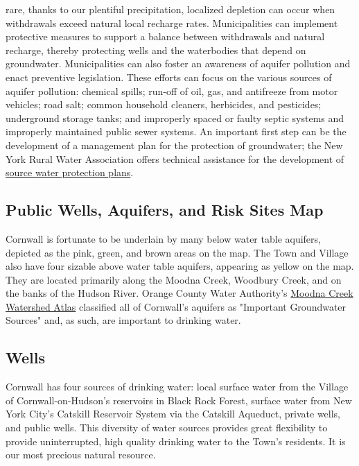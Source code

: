 rare, thanks to our plentiful precipitation, localized depletion can occur when 
withdrawals exceed natural local recharge rates. Municipalities can implement 
protective measures to support a balance between withdrawals and natural 
recharge, thereby protecting wells and the waterbodies that depend on 
groundwater. Municipalities can also foster an awareness of aquifer pollution 
and enact preventive legislation. These efforts can focus on the various sources 
of aquifer pollution: chemical spills; run-off of oil, gas, and antifreeze from 
motor vehicles; road salt; common household cleaners, herbicides, and 
pesticides; underground storage tanks; and improperly spaced or faulty septic 
systems and improperly maintained public sewer systems. An important first step 
can be the development of a management plan for the protection of groundwater; 
the New York Rural Water Association offers technical assistance for the 
development of \href{ 
http://www.nyruralwater.org/sites/default/files/Fact\%20Sheet10\_1-5-2018.pdf}{ 
source water protection plans}.

\subsection*{Public Wells, Aquifers, and Risk Sites Map}
Cornwall is fortunate to be underlain by many below water table aquifers, 
depicted as the pink, green, and brown areas on the map. The Town and Village 
also have four sizable above water table aquifers, appearing as yellow on the 
map. They are located primarily along the Moodna Creek, Woodbury Creek, and on 
the banks of the Hudson River. Orange County Water Authority's 
\href{
http://www.kj-seqra.com/507Acres/ReferenceMaterial/OCWA\%202008\%20Moodna\%20Wat
ershed\%20Atlas\%20(39MB).pdf}{Moodna Creek Watershed Atlas} classified all of 
Cornwall’s aquifers as "Important Groundwater Sources" and, as such, are 
important to drinking water.


\label{map:wells}

\subsection*{Wells}\label{subsec:wells}
Cornwall has four sources of drinking water: local surface water from the 
Village of Cornwall-on-Hudson’s reservoirs in Black Rock Forest, surface water 
from New York City’s Catskill Reservoir System via the Catskill Aqueduct, 
private wells, and public wells. This diversity of water sources provides great 
flexibility to provide uninterrupted, high quality drinking water to the Town’s 
residents. It is our most precious natural resource.

